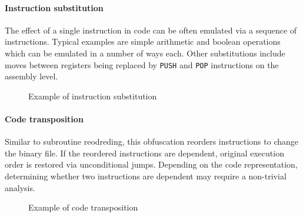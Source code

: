 \paragraph*{Instruction substitution}
The effect of a single instruction in code can be often emulated via a sequence of instructions. Typical examples are simple arithmetic and boolean operations which can be emulated in a number of ways each. Other substitutions include moves between registers being replaced by \texttt{PUSH} and \texttt{POP} instructions on the assembly level.

\begin{figure}[H]
    \centering
    \caption{Example of instruction substitution}
    \label{fig_obf_instrsub}
\end{figure}

\paragraph*{Code transposition}
Similar to subroutine reodreding, this obfuscation reorders instructions to change the binary file. If the reordered instructions are dependent, original execution order is restored via unconditional jumps. Depending on the code representation, determining whether two instructions are dependent may require a non-trivial analysis.

\begin{figure}[H]
    \centering
    \caption{Example of code transposition}
    \label{fig_obf_trans}
\end{figure}

